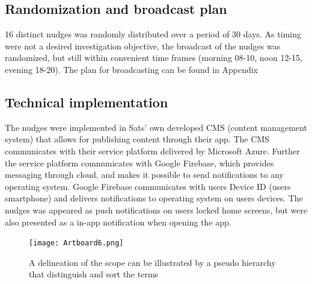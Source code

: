 \subsection{Randomization and broadcast plan}
16 distinct nudges was randomly distributed over a period of 30 days. As timing were not a desired investigation objective, the broadcast of the nudges was randomized, but still within convenient time frames (morning 08-10, noon 12-15, evening 18-20). The plan for broadcasting can be found in Appendix 

\subsection{Technical implementation}
The nudges were implemented in Sats' own developed CMS (content management system) that allows for publishing content through their app. The CMS communicates with their service platform delivered by Microsoft Azure. Further the service platform communicates with Google Firebase, which provides messaging through cloud, and makes it possible to send notifications to any operating system. Google Firebase communicates with users Device ID (users smartphone) and delivers notifications to operating system on users devices. The nudges was appeared as push notifications on users locked home screens, but were also presented as a in-app notification when opening the app. 


\bigbreak
\bigbreak
\begin{figure}[ht]
\texttt{[image: Artboard6.png]}
\caption{A delineation of the scope can be illustrated by a pseudo hierarchy that distinguish and sort the terms}
\end{figure}
\bigbreak
\bigbreak


